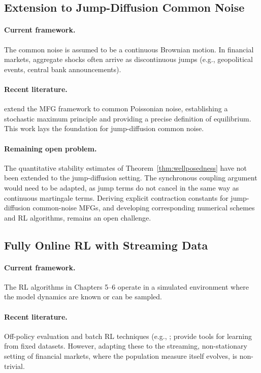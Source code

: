 \subsection{Extension to Jump-Diffusion Common Noise}

\paragraph{Current framework.} The common noise is assumed to be a continuous
Brownian motion. In financial markets, aggregate shocks often arrive as
discontinuous jumps (e.g., geopolitical events, central bank announcements).

\paragraph{Recent literature.} \citet{poissonianmfg2024} extend the
MFG framework to common Poissonian noise, establishing a stochastic maximum
principle and providing a precise definition of equilibrium. This work lays the
foundation for jump-diffusion common noise.

\paragraph{Remaining open problem.} The quantitative stability estimates of
Theorem~\ref{thm:wellposedness} have not been extended to the jump-diffusion
setting. The synchronous coupling argument would need to be adapted, as jump
terms do not cancel in the same way as continuous martingale terms. Deriving
explicit contraction constants for jump-diffusion common-noise MFGs, and
developing corresponding numerical schemes and RL algorithms, remains an open
challenge.

\subsection{Fully Online RL with Streaming Data}

\paragraph{Current framework.} The RL algorithms in Chapters 5--6 operate in a
simulated environment where the model dynamics are known or can be sampled.

\paragraph{Recent literature.} Off-policy evaluation and batch RL techniques
(e.g., \citep{precupsuttonsingh2000}; \citep{langegabelriedmiller2012}
provide tools for learning from fixed datasets. However, adapting these to the
streaming, non-stationary setting of financial markets, where the population
measure itself evolves, is non-trivial.

